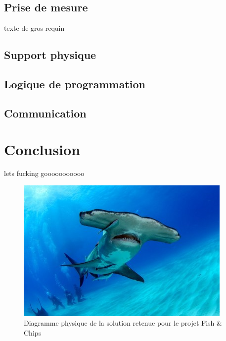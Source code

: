 \subsection{Prise de mesure}

texte de gros requin

\subsection{Support physique}

\subsection{Logique de programmation}

\subsection{Communication}


\section{Conclusion}

lets fucking gooooooooooo

\begin{figure}
    \centering
    \includegraphics[width=\linewidth]{fig/requinmarto.jpg}
    \caption{Diagramme physique de la solution retenue pour le projet Fish \& Chips}
    \label{fig:concept_retenu}
\end{figure}

